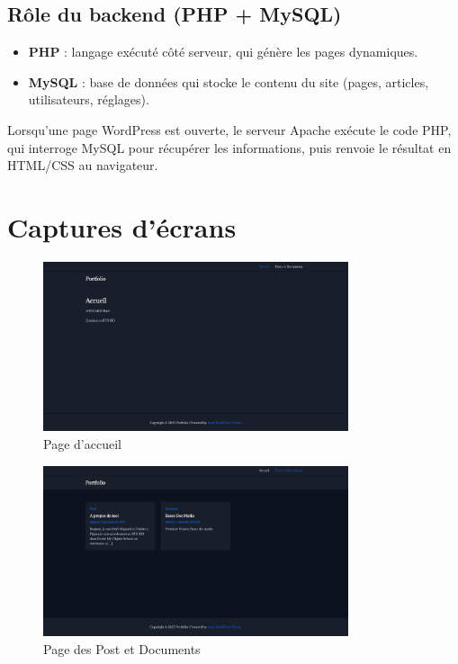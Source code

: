 \documentclass[a4paper,12pt]{article}
\begin{document}
\subsection*{Rôle du backend (PHP + MySQL)}
\begin{itemize}
    \item \textbf{PHP} : langage exécuté côté serveur, qui génère les pages dynamiques.
    \item \textbf{MySQL} : base de données qui stocke le contenu du site (pages, articles, utilisateurs, réglages).
\end{itemize}
Lorsqu’une page WordPress est ouverte, le serveur Apache exécute le code PHP, 
qui interroge MySQL pour récupérer les informations, puis renvoie le résultat en HTML/CSS 
au navigateur.


\clearpage
\section*{Captures d'écrans}

\begin{figure}[h!]
    \centering
    \includegraphics[width=0.8\textwidth]{home.png}
    \caption{Page d'accueil}
    \label{fig:capture1}
\end{figure}

\begin{figure}[h!]
    \centering
    \includegraphics[width=0.8\textwidth]{post.png}
    \caption{Page des Post et Documents}
    \label{fig:capture2}
\end{figure}
\end{document}
